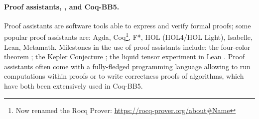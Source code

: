 \documentclass[letterpaper,british,11pt]{article}
\theoremstyle{definition} %
\numberwithin{equation}{section}
\theoremstyle{definition} %
\newcommand{\ts}[1]{{\color{red}#1}}
\newcommand{\CoqBB}{Coq-BB5\xspace}
\begin{document}

\paragraph{Proof assistants, \Coq, and \CoqBB.} Proof assistants are software tools able to express and verify formal proofs; some popular proof assistants are: Agda, Coq\footnote{Now renamed the Rocq Prover: \url{https://rocq-prover.org/about\#Name}}, F*, HOL (HOL4/HOL Light), Isabelle, Lean, Metamath. Milestones in the use of proof assistants include: the four-color theorem \cite{gonthier2008formal, gonthier2023computer}; the Kepler Conjecture \cite{3fdf2c9143a54629bba02e34f24c7698}; the liquid tensor experiment in Lean \cite{2309.14870}. Proof assistants often come with a fully-fledged programming language allowing to run computations within proofs or to write correctness proofs of algorithms, which have both been extensively used in \CoqBB.

\end{document}
